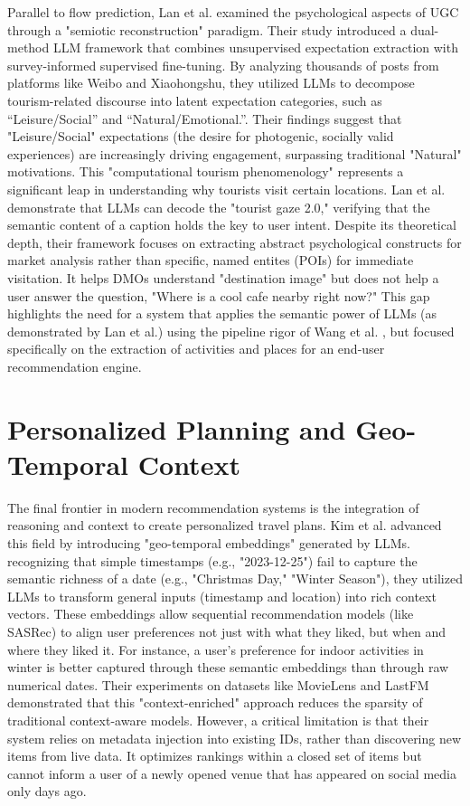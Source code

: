 \documentclass[a4paper,12pt]{report}
\begin{document}
Parallel to flow prediction, Lan et al. \cite{lan2025} examined the psychological aspects of UGC through a "semiotic reconstruction" paradigm. Their study introduced a dual-method LLM framework that combines unsupervised expectation extraction with survey-informed supervised fine-tuning. By analyzing thousands of posts from platforms like Weibo and Xiaohongshu, they utilized LLMs to decompose tourism-related discourse into latent expectation categories, such as “Leisure/Social” and “Natural/Emotional.”. Their findings suggest that "Leisure/Social" expectations (the desire for photogenic, socially valid experiences) are increasingly driving engagement, surpassing traditional "Natural" motivations. This "computational tourism phenomenology" represents a significant leap in understanding why tourists visit certain locations. Lan et al. demonstrate that LLMs can decode the "tourist gaze 2.0," verifying that the semantic content of a caption holds the key to user intent. Despite its theoretical depth, their framework focuses on extracting abstract psychological constructs for market analysis rather than specific, named entites (POIs) for immediate visitation. It helps DMOs understand "destination image" but does not help a user answer the question, "Where is a cool cafe nearby right now?" This gap highlights the need for a system that applies the semantic power of LLMs (as demonstrated by Lan et al.) using the pipeline rigor of Wang et al. \cite{wang2025event}, but focused specifically on the extraction of activities and places for an end-user recommendation engine.

\section{Personalized Planning and Geo-Temporal Context}
The final frontier in modern recommendation systems is the integration of reasoning and context to create personalized travel plans. Kim et al. \cite{kim2025} advanced this field by introducing "geo-temporal embeddings" generated by LLMs. recognizing that simple timestamps (e.g., "2023-12-25") fail to capture the semantic richness of a date (e.g., "Christmas Day," "Winter Season"), they utilized LLMs to transform general inputs (timestamp and location) into rich context vectors. These embeddings allow sequential recommendation models (like SASRec) to align user preferences not just with what they liked, but when and where they liked it. For instance, a user’s preference for indoor activities in winter is better captured through these semantic embeddings than through raw numerical dates. Their experiments on datasets like MovieLens and LastFM demonstrated that this "context-enriched" approach reduces the sparsity of traditional context-aware models. However, a critical limitation is that their system relies on metadata injection into existing IDs, rather than discovering new items from live data. It optimizes rankings within a closed set of items but cannot inform a user of a newly opened venue that has appeared on social media only days ago.
\end{document}
